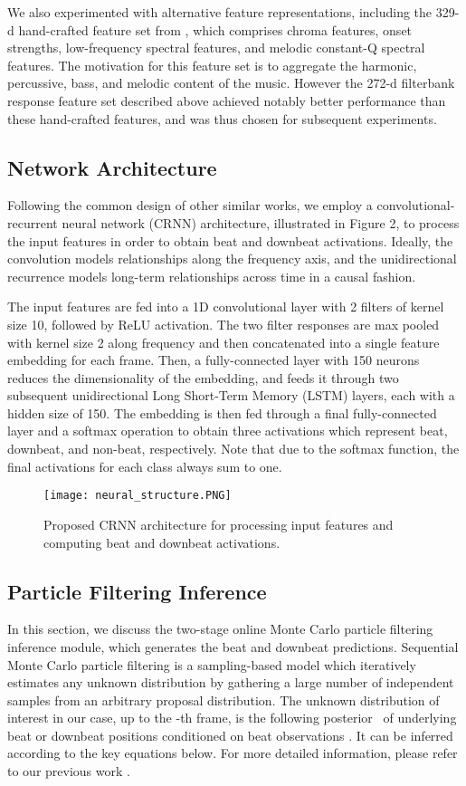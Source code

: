 \documentclass{article}
\begin{document}
We also experimented with alternative feature representations, including the 329-d hand-crafted feature set from \cite{durand:1}, which comprises chroma features, onset strengths, low-frequency spectral features, and melodic constant-Q spectral features. The motivation for this feature set is to aggregate the harmonic, percussive, bass, and melodic content of the music. However the 272-d filterbank response feature set described above achieved notably better performance than these hand-crafted features, and was thus chosen for subsequent experiments.

\subsection{Network Architecture}
Following the common design of other similar works, we employ a convolutional-recurrent neural network (CRNN) architecture, illustrated in Figure 2, to process the input features in order to obtain beat and downbeat activations. Ideally, the convolution models relationships along the frequency axis, and the unidirectional recurrence models long-term relationships across time in a causal fashion.

The input features are fed into a 1D convolutional layer with 2 filters of kernel size 10, followed by ReLU activation. The two filter responses are max pooled with kernel size 2 along frequency and then concatenated into a single feature embedding for each frame.
Then, a fully-connected layer with 150 neurons reduces the dimensionality of the embedding, and feeds it through two subsequent unidirectional Long Short-Term Memory (LSTM) layers, each with a hidden size of 150. The embedding is then fed through a final fully-connected layer and a softmax operation to obtain three activations which represent beat, downbeat, and non-beat, respectively. Note that due to the softmax function, the final activations for each class always sum to one.



\begin{figure}[htbp]
 \centerline{
 \texttt{[image: neural\_structure.PNG]}}
 \caption{Proposed CRNN architecture for processing input features and computing beat and downbeat activations.}
 \label{fig2}
\end{figure}

\subsection{Particle Filtering Inference}
In this section, we discuss the two-stage online Monte Carlo particle filtering inference module, which generates the beat and downbeat predictions. Sequential Monte Carlo particle filtering is a sampling-based model which iteratively estimates any unknown distribution  by gathering a large number of independent samples from an arbitrary proposal distribution. The unknown distribution of interest in our case, up to the -th frame, is the following posterior \ of underlying beat or downbeat positions  conditioned on beat observations . It can be inferred according to the key equations below. For more detailed information, please refer to our previous work \cite{Heydari}.
\end{document}
